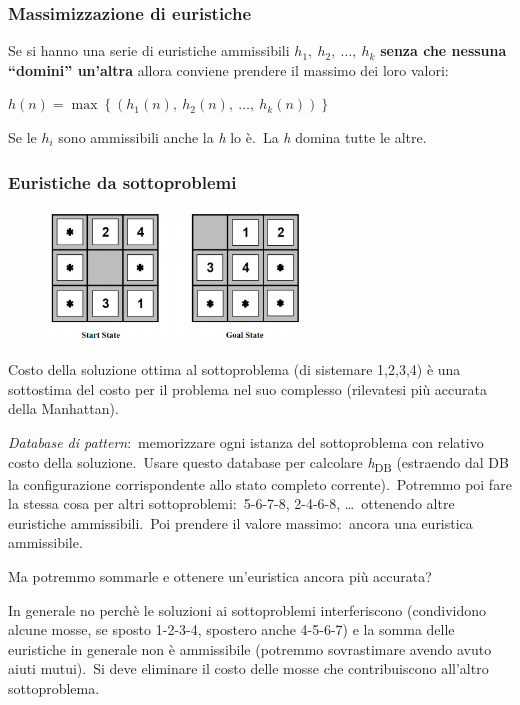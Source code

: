 \subsubsection{Massimizzazione di euristiche}

Se si hanno una serie di euristiche ammissibili
$h_1,\ h_2,\ \dots,\ h_k$ \textbf{senza che nessuna ``domini'' un'altra} allora conviene prendere il massimo dei loro valori:
\begin{center}
	$h(n)=\max\left\{(h_1(n),\ h_2(n),\ \dots,\ h_k(n))\right\}$
\end{center}
Se le $h_i$ sono ammissibili anche la \textit{h} lo è.\
La \textit{h} domina tutte le altre.

\subsubsection{Euristiche da sottoproblemi}

\begin{figure}[H]
	\centering
	\includegraphics[width=0.6\textwidth]{immagini/sottoproblemi.png}
\end{figure}

Costo della soluzione ottima al sottoproblema (di sistemare 1,2,3,4) è una sottostima del costo per il problema nel suo complesso (rilevatesi più accurata della Manhattan).\

\textit{Database di pattern}:\ memorizzare ogni istanza del sotto\-problema con re\-lativo costo della soluzione.\
Usare questo database per calcolare \textit{h}\textsubscript{DB} (estraendo dal DB la configurazione corrispondente allo stato completo corrente).\
Potremmo poi fare la stessa cosa per altri sottoproblemi:\ 5-6-7-8, 2-4-6-8, \dots\ ottenendo altre euristiche ammissibili.\
Poi prendere il valore massimo:\ ancora una euristica ammissibile.

Ma potremmo sommarle e ottenere un'euristica ancora più accurata?

In generale no perchè le soluzioni ai sottoproblemi interferiscono (condividono alcune mosse, se sposto 1-2-3-4, spostero anche 4-5-6-7) e la somma delle euristiche in generale non è ammissibile (potremmo sovrastimare avendo avuto aiuti mutui).\
Si deve eliminare il costo delle mosse che contribuiscono all'altro sottoproblema.

